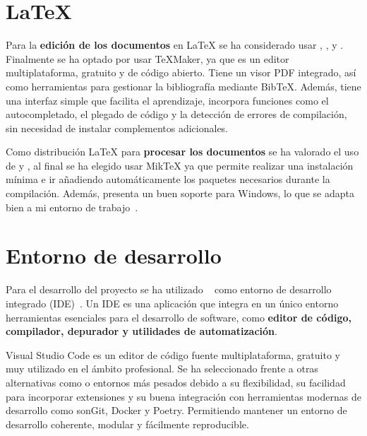 \section{\LaTeX{}}
Para la \textbf{edición de los documentos} en \LaTeX{} se ha considerado usar , ,  y . Finalmente se ha optado por usar \TeX{Maker}, ya que es un editor multiplataforma, gratuito y de código abierto. Tiene un visor PDF integrado, así como herramientas para gestionar la bibliografía mediante Bib\TeX{}. Además, tiene una interfaz simple que facilita el aprendizaje, incorpora funciones como el autocompletado, el plegado de código y la detección de errores de compilación, sin necesidad de instalar complementos adicionales.

Como distribución \LaTeX{} para \textbf{procesar los documentos}  se ha valorado el uso de  y , al final se ha elegido usar Mik\TeX{} ya que permite realizar una instalación mínima e ir añadiendo automáticamente los paquetes necesarios durante la compilación. Además, presenta un buen soporte para Windows, lo que se adapta bien a mi entorno de trabajo~\cite{miktex:textlive}.

\section{Entorno de desarrollo}
Para el desarrollo del proyecto se ha utilizado ~\cite{herramienta:vscode} como entorno de desarrollo integrado (IDE)~\cite{herramienta:IDE}. Un IDE es una aplicación que integra en un único entorno herramientas esenciales para el desarrollo de software, como \textbf{editor de código, compilador, depurador y utilidades de automatización}. 

Visual Studio Code es un editor de código fuente multiplataforma, gratuito y muy utilizado en el ámbito profesional. Se ha seleccionado frente a otras alternativas como  o entornos más pesados debido a su flexibilidad, su facilidad para incorporar extensiones y su buena integración con herramientas modernas de desarrollo como sonGit, Docker y Poetry. Permitiendo mantener un entorno de desarrollo coherente, modular y fácilmente reproducible.

